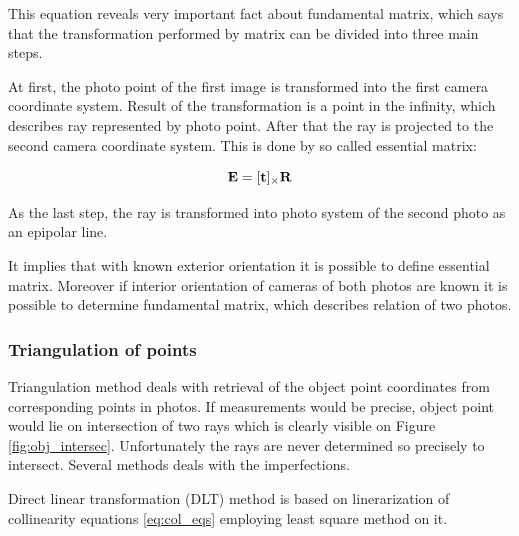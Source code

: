 \documentclass[a4paper,12pt]{article}
\newcommand{\ematr}[1]{
{\bf #1}
}
\newcommand{\evect}[1]{
{\bf #1}
}
\begin{document}
This equation reveals very important fact about fundamental matrix, which says that the transformation performed 
by matrix can be divided into three main steps.

At first, the photo point of the first image is transformed into the first camera coordinate system. Result of the transformation is a
point in the infinity, which describes ray represented by photo point. 
After that the ray is projected to the second camera coordinate system. This is done by so called essential matrix:

\begin{equation}
	 \ematr{E}  = [\evect{t}]_{\times} \ematr{R}
\end{equation}


As the last step, the ray is transformed into photo system of the second photo as an epipolar line.


It implies that with known exterior orientation it is possible to define essential matrix. 
Moreover if interior orientation of cameras of both photos are known it is possible to determine fundamental matrix,
which describes relation of two photos.

\subsubsection{Triangulation of points}
\label{eq:triang}

Triangulation method deals with retrieval of the object point coordinates
from corresponding points in photos. 
If measurements would be precise, object point 
would lie on intersection of two rays which is clearly visible on 
 Figure \ref{fig:obj_intersec}. Unfortunately the rays are never determined so precisely to intersect.
 Several methods deals with the imperfections.

Direct linear transformation (DLT) method  is based 
on linerarization of collinearity equations \eqref{eq:col_eqs}
employing least square method on it.
\end{document}
